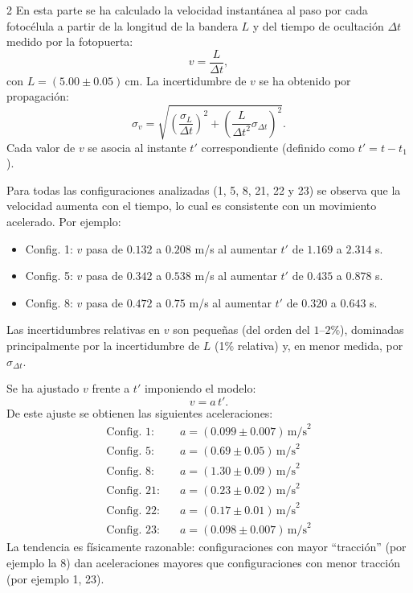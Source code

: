 \documentclass[12pt,a4paper]{article}
\begin{document}
\begin{multicols}{2}
En esta parte se ha calculado la velocidad instantánea al paso por cada fotocélula a partir de la longitud de la bandera $L$ y del tiempo de ocultación $\Delta t$ medido por la fotopuerta:
\begin{equation}
v=\frac{L}{\Delta t},
\end{equation}
con $L=(5.00\pm0.05)\,\text{cm}$. La incertidumbre de $v$ se ha obtenido por propagación:
\begin{equation}
\sigma_v=\sqrt{\left(\frac{\sigma_L}{\Delta t}\right)^2+\left(\frac{L}{\Delta t^2}\sigma_{\Delta t}\right)^2}.
\end{equation}
Cada valor de $v$ se asocia al instante $t'$ correspondiente (definido como $t'=t-t_1$).

\bigskip
Para todas las configuraciones analizadas (1, 5, 8, 21, 22 y 23) se observa que la velocidad aumenta con el tiempo, lo cual es consistente con un movimiento acelerado. Por ejemplo:
\begin{itemize}
\item Config. 1: $v$ pasa de $0.132$ a $0.208$ m/s al aumentar $t'$ de $1.169$ a $2.314$ s.
\item Config. 5: $v$ pasa de $0.342$ a $0.538$ m/s al aumentar $t'$ de $0.435$ a $0.878$ s.
\item Config. 8: $v$ pasa de $0.472$ a $0.75$ m/s al aumentar $t'$ de $0.320$ a $0.643$ s.
\end{itemize}
Las incertidumbres relativas en $v$ son pequeñas (del orden del $1$--$2\%$), dominadas principalmente por la incertidumbre de $L$ (1\% relativa) y, en menor medida, por $\sigma_{\Delta t}$.

\bigskip
Se ha ajustado $v$ frente a $t'$ imponiendo el modelo:
\begin{equation}
v = a\,t'.
\end{equation}
De este ajuste se obtienen las siguientes aceleraciones:
\begin{align*}
\text{Config. 1:}\quad & a=(0.099\pm0.007)\,\text{m/s}^2 \\
\text{Config. 5:}\quad & a=(0.69\pm0.05)\,\text{m/s}^2 \\
\text{Config. 8:}\quad & a=(1.30\pm0.09)\,\text{m/s}^2 \\
\text{Config. 21:}\quad & a=(0.23\pm0.02)\,\text{m/s}^2 \\
\text{Config. 22:}\quad & a=(0.17\pm0.01)\,\text{m/s}^2 \\
\text{Config. 23:}\quad & a=(0.098\pm0.007)\,\text{m/s}^2
\end{align*}
La tendencia es físicamente razonable: configuraciones con mayor “tracción” (por ejemplo la 8) dan aceleraciones mayores que configuraciones con menor tracción (por ejemplo 1, 23).


\end{multicols}
\end{document}
